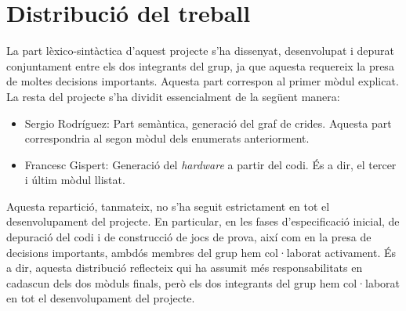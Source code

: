 
\section{Distribució del treball}

La part lèxico-sintàctica d'aquest projecte s'ha dissenyat, desenvolupat i 
depurat conjuntament entre els dos integrants del grup, ja que aquesta 
requereix la presa de moltes decisions importants. Aquesta part correspon al 
primer mòdul explicat. La resta del projecte s'ha dividit essencialment de la 
següent manera:

\begin{itemize}
\item Sergio Rodríguez: Part semàntica, generació del graf de crides. Aquesta part correspondria al segon mòdul dels enumerats anteriorment.
\item Francesc Gispert: Generació del \textit{hardware} a partir del codi. És a dir, el tercer i últim mòdul llistat.
\end{itemize}

Aquesta repartició, tanmateix, no s'ha seguit estrictament en tot el 
desenvolupament del projecte. En particular, en les fases d'especificació 
inicial, de depuració del codi i de construcció de jocs de prova, així com en 
la presa de decisions importants, ambdós membres del grup hem col·laborat 
activament. És a dir, aquesta distribució reflecteix qui ha assumit més 
responsabilitats en cadascun dels dos mòduls finals, però els dos integrants 
del grup hem col·laborat en tot el desenvolupament del projecte.


